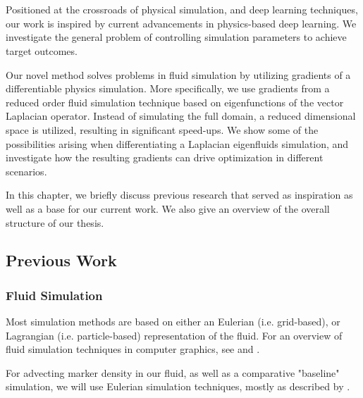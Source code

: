 \chapter{\bevezetes}

Positioned at the crossroads of physical simulation, and deep learning
techniques, our work is inspired by current advancements in physics-based deep
learning. We investigate the general problem of controlling simulation
parameters to achieve target outcomes.


Our novel method solves problems in fluid simulation by utilizing gradients of
a differentiable physics simulation. More specifically, we use gradients from
a reduced order fluid simulation technique based on eigenfunctions of the vector
Laplacian operator. Instead of simulating the full domain, a reduced dimensional
space is utilized, resulting in significant speed-ups. We show some of the
possibilities arising when differentiating a Laplacian eigenfluids simulation,
and investigate how the resulting gradients can drive optimization in different
scenarios.


In this chapter, we briefly discuss previous research that served as inspiration
as well as a base for our current work. We also give an overview of the overall
structure of our thesis. 

\section{Previous Work}
\subsection{Fluid Simulation}
Most simulation methods are based on either an Eulerian (i.e.  grid-based), or
Lagrangian (i.e. particle-based) representation of the fluid.  For an overview
of fluid simulation techniques in computer graphics, see \cite{FluidNotes} and
\cite{BridsonFluid}. 

For advecting marker density in our fluid, as well as a comparative "baseline"
simulation, we will use Eulerian simulation techniques, mostly as described by
\cite{StableFluids}.

